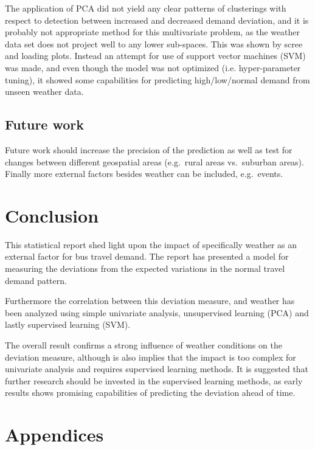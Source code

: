 \documentclass[a4paper,11pt]{article}
\begin{document}
The application of PCA did not yield any clear patterns of clusterings with respect to detection between increased and decreased demand deviation, and it is probably not appropriate method for this multivariate
problem, as the weather data set does not project well to any lower sub-spaces. This was shown by scree and loading plots. Instead an attempt for use of support vector machines (SVM) was made, and even though the model was not optimized (i.e. hyper-parameter tuning), it showed some capabilities for predicting high/low/normal demand from unseen weather data.

\subsection{Future work}
Future work should increase the precision of the prediction as well as test for changes between different geospatial areas (e.g.\ rural areas vs.\ suburban areas). Finally more external factors besides weather can be included, e.g.\ events.

\section{Conclusion}
This statistical report shed light upon the impact of specifically weather as an external factor for bus travel demand. The report has presented a model for measuring the deviations from the expected variations in the normal travel demand pattern.

Furthermore the correlation between this deviation measure, and weather has been analyzed using simple univariate analysis, unsupervised learning (PCA) and lastly supervised learning (SVM).

The overall result confirms a strong influence of weather conditions on the deviation measure, although is also implies that the impact is too complex for univariate analysis and requires supervised learning methods. It is suggested that further research should be invested in the supervised learning methods, as early results shows promising capabilities of predicting the deviation ahead of time.

\clearpage
\begin{spacing}{1}
  
  
\end{spacing}

\clearpage
\appendix
\section*{Appendices}
\renewcommand{\thesubsection}{\Alph{subsection}}


\clearpage

\clearpage

\end{document}
